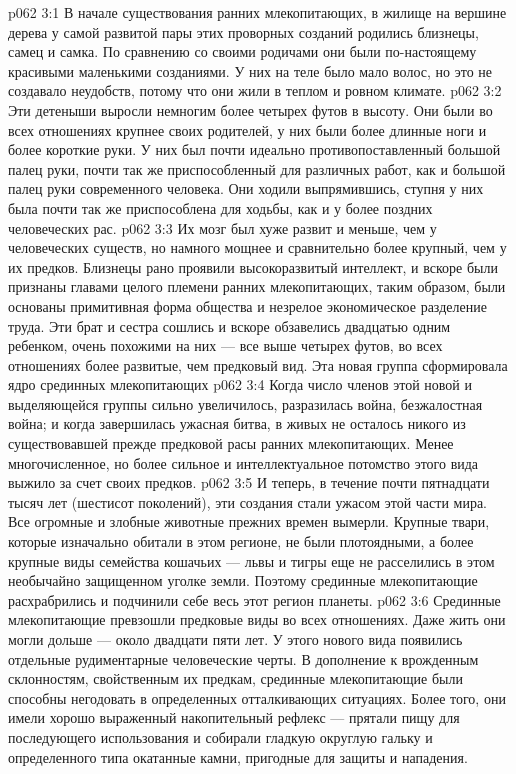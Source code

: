 \vs p062 3:1 В начале существования ранних млекопитающих, в жилище на вершине дерева у самой развитой пары этих проворных созданий родились близнецы, самец и самка. По сравнению со своими родичами они были по\hyp{}настоящему красивыми маленькими созданиями. У них на теле было мало волос, но это не создавало неудобств, потому что они жили в теплом и ровном климате.
\vs p062 3:2 Эти детеныши выросли немногим более четырех футов в высоту. Они были во всех отношениях крупнее своих родителей, у них были более длинные ноги и более короткие руки. У них был почти идеально противопоставленный большой палец руки, почти так же приспособленный для различных работ, как и большой палец руки современного человека. Они ходили выпрямившись, ступня у них была почти так же приспособлена для ходьбы, как и у более поздних человеческих рас.
\vs p062 3:3 Их мозг был хуже развит и меньше, чем у человеческих существ, но намного мощнее и сравнительно более крупный, чем у их предков. Близнецы рано проявили высокоразвитый интеллект, и вскоре были признаны главами целого племени ранних млекопитающих, таким образом, были основаны примитивная форма общества и незрелое экономическое разделение труда. Эти брат и сестра сошлись и вскоре обзавелись двадцатью одним ребенком, очень похожими на них --- все выше четырех футов, во всех отношениях более развитые, чем предковый вид. Эта новая группа сформировала ядро срединных млекопитающих
\vs p062 3:4 Когда число членов этой новой и выделяющейся группы сильно увеличилось, разразилась война, безжалостная война; и когда завершилась ужасная битва, в живых не осталось никого из существовавшей прежде предковой расы ранних млекопитающих. Менее многочисленное, но более сильное и интеллектуальное потомство этого вида выжило за счет своих предков.
\vs p062 3:5 И теперь, в течение почти пятнадцати тысяч лет (шестисот поколений), эти создания стали ужасом этой части мира. Все огромные и злобные животные прежних времен вымерли. Крупные твари, которые изначально обитали в этом регионе, не были плотоядными, а более крупные виды семейства кошачьих --- львы и тигры еще не расселились в этом необычайно защищенном уголке земли. Поэтому срединные млекопитающие расхрабрились и подчинили себе весь этот регион планеты.
\vs p062 3:6 \pc Срединные млекопитающие превзошли предковые виды во всех отношениях. Даже жить они могли дольше --- около двадцати пяти лет. У этого нового вида появились отдельные рудиментарные человеческие черты. В дополнение к врожденным склонностям, свойственным их предкам, срединные млекопитающие были способны негодовать в определенных отталкивающих ситуациях. Более того, они имели хорошо выраженный накопительный рефлекс --- прятали пищу для последующего использования и собирали гладкую округлую гальку и определенного типа окатанные камни, пригодные для защиты и нападения.
